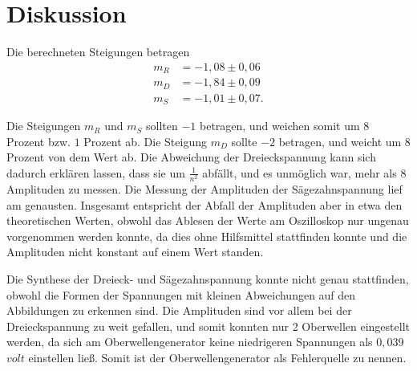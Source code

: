 \section{Diskussion}
\label{sec:Diskussion}

Die berechneten Steigungen betragen
\begin{align}
m_R &= -1,08 \pm 0,06 \\
m_D &= -1,84 \pm 0,09 \\
m_S &= -1,01 \pm 0,07 .
\end{align}


Die Steigungen $m_R$ und $m_S$ sollten $-1$ betragen, und weichen somit um $8$ Prozent bzw. $1$ Prozent ab. 
Die Steigung $m_D$ sollte $-2$ betragen, und weicht um $8$ Prozent von dem Wert ab. Die Abweichung 
der Dreieckspannung kann sich dadurch erklären lassen, dass sie um $\frac{1}{n^2}$ abfällt, und es unmöglich war, mehr als 8 Amplituden zu messen.
Die Messung der Amplituden der Sägezahnspannung lief am genausten. 
Insgesamt entspricht der Abfall der Amplituden aber in etwa den theoretischen Werten, obwohl das Ablesen der Werte am Oszilloskop nur ungenau vorgenommen werden konnte, da dies ohne 
Hilfsmittel stattfinden konnte und die Amplituden nicht konstant auf einem Wert standen.

\noindent Die Synthese der Dreieck- und Sägezahnspannung konnte nicht genau stattfinden, obwohl die Formen der Spannungen mit kleinen Abweichungen auf den Abbildungen zu erkennen sind.
Die Amplituden sind vor allem bei der Dreieckspannung zu weit gefallen, und somit konnten nur 2 Oberwellen eingestellt werden, da sich am Oberwellengenerator keine niedrigeren Spannungen als
$0,039$ $\si{volt}$ einstellen ließ.
Somit ist der Oberwellengenerator als Fehlerquelle zu nennen. 